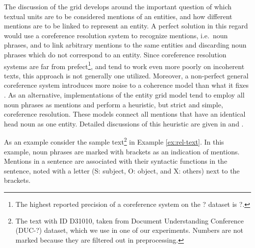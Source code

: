 The discussion of the grid develops around the important question of which textual units are to be considered mentions of an entities, and how different mentions are to be linked to represent an entity. 
A perfect solution in this regard would use a coreference resolution system to recognize mentions, i.e.\ noun phrases, and to link arbitrary mentions to the same entities and discarding noun phrases which do not correspond to an entity. 
Since coreference resolution systems are far from prefect\footnote{The highest reported precision of a coreference system on the ? dataset is ?.}, and tend to work even more poorly on incoherent texts, this approach is not generally one utilized.  
Moreover, a non-perfect general coreference system introduces more noise to a coherence model than what it fixes \cite{barzilay08}.  
As an alternative, implementations of the entity grid model tend to employ all noun phrases as mentions and perform a heuristic, but strict and simple, coreference resolution. 
These models connect all mentions that have an identical head noun as one entity. 
Detailed discussions of this heuristic are given in  and . 

As an example consider the sample text\footnote{The text with ID D31010, taken from Document Understanding Conference (DUC-?) dataset, which we use in one of our experiments. Numbers are not marked because they are filtered out in preprocessing.} in Example \ref{ex:rel-text}. 
In this example, noun phrases are marked with brackets as an indication of mentions. 
Mentions in a sentence are associated with their syntactic functions in the sentence, noted with a letter (S: subject, O: object, and X: others) next to the brackets. 

